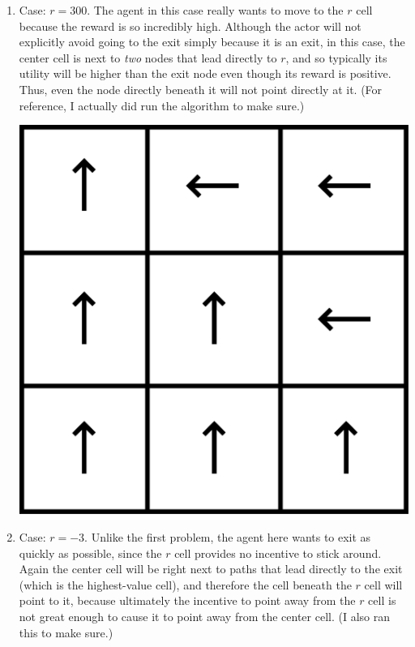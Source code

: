 \documentclass[11pt]{article}
\begin{document}
\begin{enumerate}
\item Case: $r = 300$. The agent in this case really wants to move to the $r$ cell because the reward is so incredibly high. Although the actor will not explicitly avoid going to the exit simply because it is an exit, in this case, the center cell is next to \textit{two} nodes that lead directly to $r$, and so typically its utility will be higher than the exit node even though its reward is positive. Thus, even the node directly beneath it will not point directly at it. (For reference, I actually did run the algorithm to make sure.)

\begin{center}
\includegraphics[scale=0.25]{300.png}
\end{center}

\item Case: $r = -3$. Unlike the first problem, the agent here wants to exit as quickly as possible, since the $r$ cell provides no incentive to stick around. Again the center cell will be right next to paths that lead directly to the exit (which is the highest-value cell), and therefore the cell beneath the $r$ cell will point to it, because ultimately the incentive to point away from the $r$ cell is not great enough to cause it to point away from the center cell. (I also ran this to make sure.)


\end{enumerate}
\end{document}

